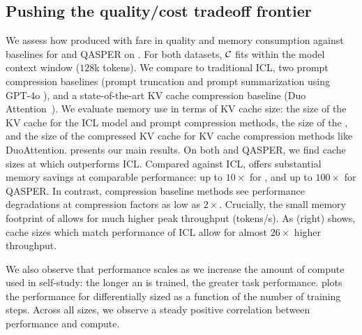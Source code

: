 \subsection{Pushing the quality/cost tradeoff frontier}
\label{sec:results-within}
We assess how \artifacts produced with \method fare in quality and memory consumption against baselines for \longhealth and QASPER on \llamathreeb.
For both datasets, $\mathcal{C}$ fits within the model context window ($128$k tokens).
We compare to traditional ICL, two prompt compression baselines (prompt truncation and prompt summarization using GPT-4o  \cite{openai2024gpt4ocard}), and a state-of-the-art KV cache compression baseline (Duo Attention~\cite{jiang-etal-2023-llmlingua,xiao2024duoattention}). We evaluate memory use in terms of KV cache size: the size of the KV cache for the ICL model and prompt compression methods, the size of the \artifact, and the size of the compressed KV cache for KV cache compression methods like DuoAttention.
 presents our main results. On both \longhealth and QASPER, we find cache sizes at which \artifacts outperforms ICL. Compared against ICL, \artifacts offers substantial memory savings at comparable performance: up to $10\times$ for \longhealth,  and up to $100\times$ for QASPER. In contrast, compression baseline methods see performance degradations at compression factors as low as $2\times$. Crucially, the small memory footprint of \artifacts allows for much higher peak throughput (tokens/s).
As  (right) shows, cache sizes which match performance of ICL allow for almost $26\times$ higher throughput.
\ifx\conference\neuripsconf

\fi
\ifx\conference\arxivconf

\fi
We also observe that \artifact performance scales as we increase the amount of compute used in self-study: the longer an \artifact is trained, the greater task performance.  plots the performance for differentially sized \artifacts as a function of the number of training steps. Across all sizes, we observe a steady positive correlation between performance and compute.
\vspace{-2mm}
